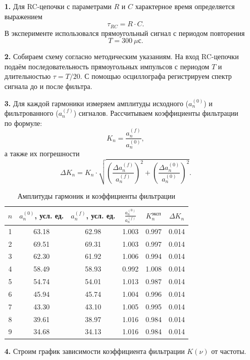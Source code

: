 \documentclass[a4paper,12pt]{article}
\begin{document}
\begin{enumerate}
\item [\textbf{1.}] Для RC-цепочки с параметрами $R$ и $C$ характерное время определяется выражением
\[
\tau_{RC} = R \cdot C.
\]
В эксперименте использовался прямоугольный сигнал с периодом повторения 
\[
T = 300\ \mu\text{с}.
\]

\item [\textbf{2.}] Собираем схему согласно методическим указаниям. На вход RC-цепочки подаём последовательность прямоугольных импульсов с периодом $T$ и длительностью $\tau = T/20$. С помощью осциллографа регистрируем спектр сигнала до и после фильтра.

\item [\textbf{3.}] Для каждой гармоники измеряем амплитуды исходного ($a_n^{(0)}$) и фильтрованного ($a_n^{(f)}$) сигналов. Рассчитываем коэффициенты фильтрации по формуле:
\[
K_n = \frac{a_n^{(f)}}{a_n^{(0)}},
\]
а также их погрешности
\[
\Delta K_n = K_n \cdot \sqrt{\left(\frac{\Delta a_n^{(f)}}{a_n^{(f)}}\right)^2 + \left(\frac{\Delta a_n^{(0)}}{a_n^{(0)}}\right)^2}.
\]

\begin{table}[h!]
\centering
\begin{tabular}{|c|c|c|c|c|c|}
\hline
$n$ & $a_n^{(0)}$, усл. ед. & $a_n^{(f)}$, усл. ед. & $\frac{a_n^{(0)}}{a_n^{(f)}}$ & $K_n^{\text{эксп}}$ & $\Delta K_n$ \\ \hline
1 & 63.18 & 62.98 & 1.003 &0.997 & 0.014 \\ \hline
2 & 69.51 & 69.31 & 1.003 & 0.997 & 0.014 \\ \hline
3 & 62.30 & 61.92 & 1.006 & 0.994 & 0.014 \\ \hline
4 & 58.49 & 58.93 & 0.992 & 1.008 & 0.014 \\ \hline
5 & 54.74 & 54.01 & 1.013 & 0.987 & 0.014 \\ \hline
6 & 45.94 & 45.74 & 1.004 & 0.996 & 0.014 \\ \hline
7 & 43.30 & 43.10 & 1.005 & 0.995 & 0.014 \\ \hline
8 & 39.61 & 38.97 & 1.016 & 0.984 & 0.014 \\ \hline
9 & 34.68 & 34.13 & 1.016 & 0.984 & 0.014 \\ \hline
\end{tabular}
\caption{Амплитуды гармоник и коэффициенты фильтрации}
\label{tab:RC}
\end{table}

\item [\textbf{4.}] Строим график зависимости коэффициента фильтрации $K(\nu)$ от частоты.


\end{enumerate}
\end{document}
